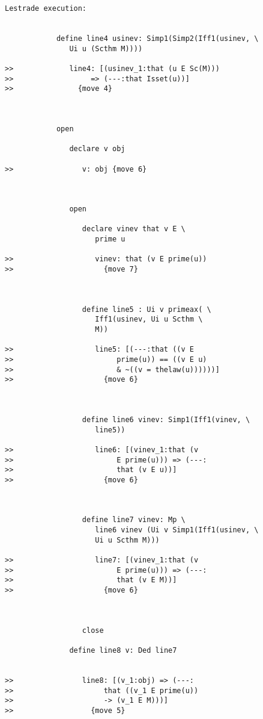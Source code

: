 \documentclass[12pt]{article}
\begin{document}
\begin{verbatim}Lestrade execution:


            define line4 usinev: Simp1(Simp2(Iff1(usinev, \
               Ui u (Scthm M))))

>>             line4: [(usinev_1:that (u E Sc(M)))
>>                  => (---:that Isset(u))]
>>               {move 4}



            open

               declare v obj

>>                v: obj {move 6}



               open

                  declare vinev that v E \
                     prime u

>>                   vinev: that (v E prime(u))
>>                     {move 7}



                  define line5 : Ui v primeax( \
                     Iff1(usinev, Ui u Scthm \
                     M))

>>                   line5: [(---:that ((v E
>>                        prime(u)) == ((v E u)
>>                        & ~((v = thelaw(u))))))]
>>                     {move 6}



                  define line6 vinev: Simp1(Iff1(vinev, \
                     line5))

>>                   line6: [(vinev_1:that (v
>>                        E prime(u))) => (---:
>>                        that (v E u))]
>>                     {move 6}



                  define line7 vinev: Mp \
                     line6 vinev (Ui v Simp1(Iff1(usinev, \
                     Ui u Scthm M)))

>>                   line7: [(vinev_1:that (v
>>                        E prime(u))) => (---:
>>                        that (v E M))]
>>                     {move 6}



                  close

               define line8 v: Ded line7


>>                line8: [(v_1:obj) => (---:
>>                     that ((v_1 E prime(u))
>>                     -> (v_1 E M)))]
>>                  {move 5}




\end{verbatim}
\end{document}
